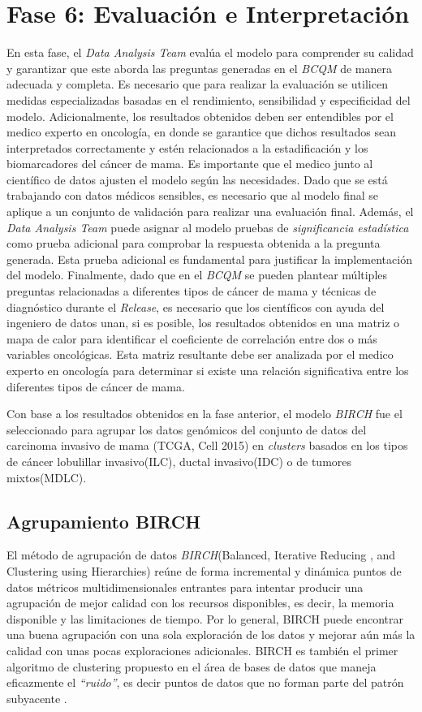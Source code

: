 \section{Fase 6: Evaluación e Interpretación}
En esta fase, el \textit{Data Analysis Team} evalúa el modelo para comprender su calidad y garantizar que este aborda las preguntas generadas en el \textit{BCQM} de manera adecuada y completa. Es necesario que para realizar la evaluación se utilicen medidas especializadas basadas en el rendimiento, sensibilidad y especificidad del modelo. Adicionalmente, los resultados obtenidos deben ser entendibles por el medico experto en oncología, en donde se garantice que dichos resultados sean interpretados correctamente y estén relacionados a la estadificación y los biomarcadores del cáncer de mama. Es importante que el medico junto al científico de datos ajusten el modelo según las necesidades. Dado que se está trabajando con datos médicos sensibles, es necesario que al modelo final se aplique a un conjunto de validación para realizar una evaluación final. Además, el \textit{Data Analysis Team} puede asignar al modelo pruebas de \textit{significancia estadística} como prueba adicional para comprobar la respuesta obtenida a la pregunta generada. Esta prueba adicional es fundamental para justificar la implementación del modelo. Finalmente, dado que en el \textit{BCQM} se pueden plantear múltiples preguntas relacionadas a diferentes tipos de cáncer de mama y técnicas de diagnóstico durante el \textit{Release}, es necesario que los científicos con ayuda del ingeniero de datos unan, si es posible, los resultados obtenidos en una matriz o mapa de calor para identificar el coeficiente de correlación entre dos o más variables oncológicas. Esta matriz resultante debe ser analizada por el medico experto en oncología para determinar si existe una relación significativa entre los diferentes tipos de cáncer de mama.

Con base a los resultados obtenidos en la fase anterior, el modelo \textit{BIRCH} fue el seleccionado para agrupar los datos genómicos del conjunto de datos del carcinoma invasivo de mama (TCGA, Cell 2015) en \textit{clusters} basados en los tipos de cáncer lobulillar invasivo(ILC), ductal invasivo(IDC) o de tumores mixtos(MDLC).

\subsection{Agrupamiento BIRCH}
El método de agrupación de datos \textit{BIRCH}(Balanced, Iterative Reducing , and Clustering using Hierarchies) reúne de forma incremental y dinámica puntos de datos métricos multidimensionales entrantes para intentar producir una agrupación de mejor calidad con los recursos disponibles, es decir, la memoria disponible y las limitaciones de tiempo. Por lo general, BIRCH puede encontrar una buena agrupación con una sola exploración de los datos y mejorar aún más la calidad con unas pocas exploraciones adicionales. BIRCH es también el primer algoritmo de clustering propuesto en el área de bases de datos que maneja eficazmente el \textit{“ruido”}, es decir puntos de datos que no forman parte del patrón subyacente \cite{Zhang1996}. 

